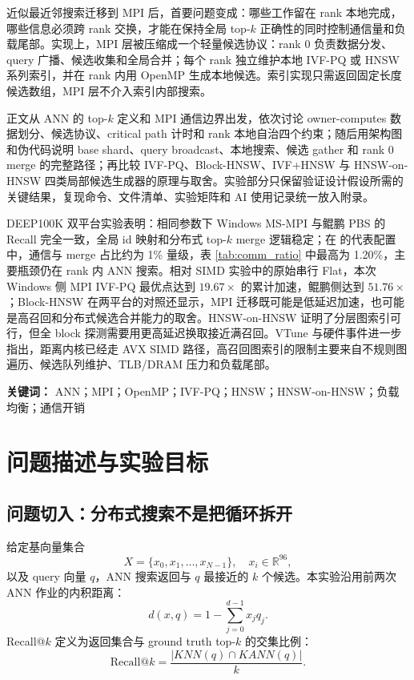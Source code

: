 \documentclass[a4paper,11pt,UTF8]{ctexart}
\newcommand{\code}[1]{\texttt{\detokenize{#1}}}
\begin{document}
近似最近邻搜索迁移到 MPI 后，首要问题变成：哪些工作留在 rank 本地完成，哪些信息必须跨 rank 交换，才能在保持全局 top-$k$ 正确性的同时控制通信量和负载尾部。实现上，MPI 层被压缩成一个轻量候选协议：rank 0 负责数据分发、query 广播、候选收集和全局合并；每个 rank 独立维护本地 IVF-PQ 或 HNSW 系列索引，并在 rank 内用 OpenMP 生成本地候选。索引实现只需返回固定长度候选数组，MPI 层不介入索引内部搜索。

正文从 ANN 的 top-$k$ 定义和 MPI 通信边界出发，依次讨论 owner-computes 数据划分、候选协议、critical path 计时和 rank 本地自治四个约束；随后用架构图和伪代码说明 base shard、query broadcast、本地搜索、候选 gather 和 rank 0 merge 的完整路径；再比较 IVF-PQ、Block-HNSW、IVF+HNSW 与 HNSW-on-HNSW 四类局部候选生成器的原理与取舍。实验部分只保留验证设计假设所需的关键结果，复现命令、文件清单、实验矩阵和 AI 使用记录统一放入附录。

DEEP100K 双平台实验表明：相同参数下 Windows MS-MPI 与鲲鹏 PBS 的 Recall 完全一致，全局 id 映射和分布式 top-$k$ merge 逻辑稳定；在 \code{np=8, threads=2, query=2000} 的代表配置中，通信与 merge 占比约为 1\% 量级，表 \ref{tab:comm_ratio} 中最高为 1.20\%，主要瓶颈仍在 rank 内 ANN 搜索。相对 SIMD 实验中的原始串行 Flat，本次 Windows 侧 MPI IVF-PQ 最优点达到 $19.67\times$ 的累计加速，鲲鹏侧达到 $51.76\times$；Block-HNSW 在两平台的对照还显示，MPI 迁移既可能是低延迟加速，也可能是高召回和分布式候选合并能力的取舍。HNSW-on-HNSW 证明了分层图索引可行，但全 block 探测需要用更高延迟换取接近满召回。VTune 与硬件事件进一步指出，距离内核已经走 AVX SIMD 路径，高召回图索引的限制主要来自不规则图遍历、候选队列维护、TLB/DRAM 压力和负载尾部。

\noindent\textbf{关键词：} ANN；MPI；OpenMP；IVF-PQ；HNSW；HNSW-on-HNSW；负载均衡；通信开销

\section{问题描述与实验目标}

\subsection{问题切入：分布式搜索不是把循环拆开}

给定基向量集合
\[
X=\{x_0,x_1,\ldots,x_{N-1}\}, \quad x_i\in \mathbb{R}^{96},
\]
以及 query 向量 $q$，ANN 搜索返回与 $q$ 最接近的 $k$ 个候选。本实验沿用前两次 ANN 作业的内积距离：
\[
d(x,q)=1-\sum_{j=0}^{d-1}x_jq_j.
\]
Recall@$k$ 定义为返回集合与 ground truth top-$k$ 的交集比例：
\[
\mathrm{Recall@}k=\frac{|KNN(q)\cap KANN(q)|}{k}.
\]
\end{document}
